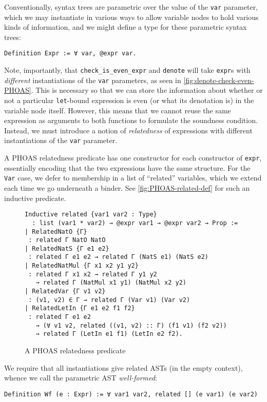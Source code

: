 Conventionally, syntax trees are parametric over the value of the \texttt{var} parameter, which we may instantiate in various ways to allow variable nodes to hold various kinds of information, and we might define a type for these parametric syntax trees:
\begin{verbatim}
Definition Expr := ∀ var, @expr var.
\end{verbatim}
Note, importantly, that \texttt{check_is_even_expr} and \texttt{denote} will take \texttt{expr}s with \emph{different} instantiations of the \texttt{var} parameters, as seen in \autoref{fig:denote-check-even-PHOAS}.
This is necessary so that we can store the information about whether or not a particular \texttt{let}-bound expression is even (or what its denotation is) in the variable node itself.
However, this means that we cannot reuse the same expression as arguments to both functions to formulate the soundness condition.
Instead, we must introduce a notion of \emph{relatedness} of expressions with different instantiations of the \texttt{var} parameter.

A PHOAS relatedness predicate has one constructor for each constructor of \texttt{expr}, essentially encoding that the two expressions have the same structure.
For the \texttt{Var} case, we defer to membership in a list of ``related'' variables, which we extend each time we go underneath a binder.
See \autoref{fig:PHOAS-related-def} for such an inductive predicate.

\begin{figure}
\centering
\begin{verbatim}
Inductive related {var1 var2 : Type}
  : list (var1 * var2) → @expr var1 → @expr var2 → Prop :=
| RelatedNatO {Γ}
 : related Γ NatO NatO
| RelatedNatS {Γ e1 e2}
 : related Γ e1 e2 → related Γ (NatS e1) (NatS e2)
| RelatedNatMul {Γ x1 x2 y1 y2}
 : related Γ x1 x2 → related Γ y1 y2
   → related Γ (NatMul x1 y1) (NatMul x2 y2)
| RelatedVar {Γ v1 v2}
 : (v1, v2) ∈ Γ → related Γ (Var v1) (Var v2)
| RelatedLetIn {Γ e1 e2 f1 f2}
 : related Γ e1 e2
   → (∀ v1 v2, related ((v1, v2) :: Γ) (f1 v1) (f2 v2))
   → related Γ (LetIn e1 f1) (LetIn e2 f2).
\end{verbatim}
\caption{A PHOAS relatedness predicate}\label{fig:PHOAS-related-def}
\end{figure}

We require that all instantiations give related ASTs (in the empty context), whence we call the parametric AST \emph{well-formed}:
\begin{verbatim}
Definition Wf (e : Expr) := ∀ var1 var2, related [] (e var1) (e var2)
\end{verbatim}
\label{sec:PHOAS:Wf-def}

